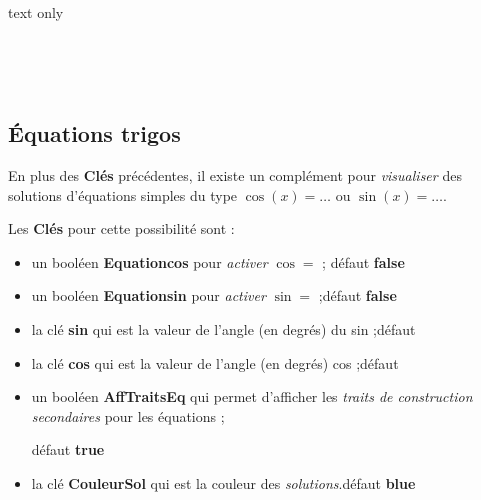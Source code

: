 \documentclass[a4paper,french,11pt]{article}
\newcommand\cmaj[1]{%
	{\tcbox[vignetteMaJ]{#1}\xspace}%
}
\newcommand\Cle[1]{{\bfseries\sffamily\textlangle #1\textrangle}}
\begin{document}
\begin{PresCodeSortiePL}{text only}
\begin{center}
	\begin{tikzpicture}[line join=bevel]
			\CercleTrigo[Rayon=2.5,AffValeurs=false,Decal=8pt]
		\end{tikzpicture}
	~~~~
	\begin{tikzpicture}[line join=bevel]
			\CercleTrigo[Rayon=2.5,AffAngles=false]
		\end{tikzpicture}
	~~~~
	\begin{tikzpicture}[line join=bevel]
			\CercleTrigo[Rayon=2.5,MoinsPi=false,CouleurFond=orange!15,TailleValeurs=\tiny]
		\end{tikzpicture}
\end{center}
\end{PresCodeSortiePL}

\subsection{Équations trigos}

\begin{noteblock}
En plus des \Cle{Clés} précédentes, il existe un complément pour \textit{visualiser} des solutions d'équations simples du type $\cos(x)=\ldots$ ou $\sin(x)=\ldots$.
\end{noteblock}

\begin{cautionblock}
Les \Cle{Clés} pour cette possibilité sont :

\begin{itemize}
	\item un booléen \Cle{Equationcos} pour \textit{activer} \og $\cos=$ \fg; \hfill{}défaut \Cle{false}
	\item un booléen \Cle{Equationsin} pour \textit{activer} \og $\sin=$ \fg;\hfill{}défaut \Cle{false}
	\item la clé \Cle{sin} qui est la valeur de l'angle (en degrés) du sin ;\hfill{}défaut \Cle{30}
	\item la clé \Cle{cos} qui est la valeur de l'angle (en degrés) cos ;\hfill{}défaut \Cle{45}
	\item \cmaj{2.6.2} un booléen \Cle{AffTraitsEq} qui permet d'afficher les \textit{traits de construction secondaires} pour les équations ;
	
	\hfill{}défaut \Cle{true}
	\item la clé \Cle{CouleurSol} qui est la couleur des \textit{solutions}.\hfill{}défaut \Cle{blue}
\end{itemize}
\vspace*{-\baselineskip}\leavevmode
\end{cautionblock}
\end{document}
